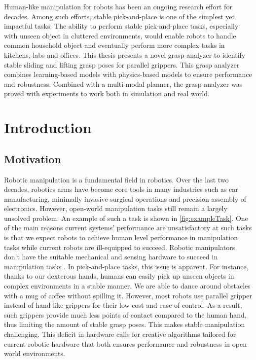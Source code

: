 \documentclass[12pt]{ucsddissertation}
\begin{document}
\begin{dissertationabstract}
Human-like manipulation for robots has been an ongoing research effort for decades. Among such efforts, stable pick-and-place is one of the simplest yet impactful tasks. The ability to perform stable pick-and-place tasks, especially with unseen object in cluttered environments, would enable robots to handle common household object and eventually perform more complex tasks in kitchens, labs and offices. This thesis presents a novel grasp analyzer to identify stable sliding and lifting grasp poses for parallel grippers. This grasp analyzer combines learning-based models with physics-based models to ensure performance and robustness. Combined with a multi-modal planner, the grasp analyzer was proved with experiments to work both in simulation and real world.
\end{dissertationabstract}

\mainmatter


\chapter{Introduction}
\section{Motivation}
Robotic manipulation is a fundamental field in robotics. Over the last two decades, robotics arms have become core tools in many industries such as car manufacturing, minimally invasive surgical operations and precision assembly of electronics. However, open-world manipulation tasks still remain a largely unsolved problem\cite{Tedrake_2023}.  An example of such a task is shown in \ref{fig:exampleTask}. One of the main reasons current systems' performance are unsatisfactory at such tasks is that we expect robots to achieve human level performance in manipulation tasks while current robots are ill-equipped to succeed. Robotic manipulators don't have the suitable mechanical and sensing hardware to succeed in manipulation tasks \cite{Wang_Liu_Zhang_Lu_2020} \cite{Xue_Ju_Xiang_Chen_Liu_2017}. In pick-and-place tasks, this issue is apparent. For instance, thanks to our dexterous hands, humans can easily pick up unseen objects in complex environments in a stable manner. We are able to dance around obstacles with a mug of coffee without spilling it. However, most robots use parallel gripper instead of hand-like grippers for their low cost and ease of control. As a result, such grippers provide much less points of contact compared to the human hand, thus limiting the amount of stable grasp poses. This makes stable manipulation challenging. This deficit in hardware calls for creative algorithms tailored for current robotic hardware that both ensures performance and robustness in open-world environments.
\end{document}
